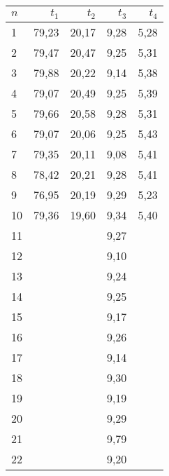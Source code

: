             \begin{table}[H]
                \centering
                \begin{tabular}{|l||r|r|r|r|}
                    \hline
                    $n$ & $t_{1}$ & $t_{2}$ & $t_{3}$ & $t_{4}$\\
                    \hline \hline
                    1 & 79,23    & 20,17    & 9,28    & 5,28\\
                    2 & 79,47    & 20,47    & 9,25    & 5,31\\
                    3 & 79,88    & 20,22    & 9,14    & 5,38\\
                    4 & 79,07    & 20,49    & 9,25    & 5,39\\
                    5 & 79,66    & 20,58    & 9,28    & 5,31\\
                    6 & 79,07    & 20,06    & 9,25    & 5,43\\
                    7 & 79,35    & 20,11    & 9,08    & 5,41\\
                    8 & 78,42    & 20,21    & 9,28    & 5,41\\
                    9 & 76,95    & 20,19    & 9,29    & 5,23\\
                    10 & 79,36   & 19,60    & 9,34    & 5,40\\
                    11 &         &          & 9,27    &     \\
                    12 &         &          & 9,10    &     \\
                    13 &         &          & 9,24    &     \\
                    14 &         &          & 9,25    &     \\
                    15 &         &          & 9,17    &     \\
                    16 &         &          & 9,26    &     \\
                    17 &         &          & 9,14    &     \\
                    18 &         &          & 9,30    &     \\
                    19 &         &          & 9,19    &     \\
                    20 &         &          & 9,29    &     \\
                    21 &         &          & 9,79    &     \\
                    22 &         &          & 9,20    &     \\

\end{tabular}
\end{table}
